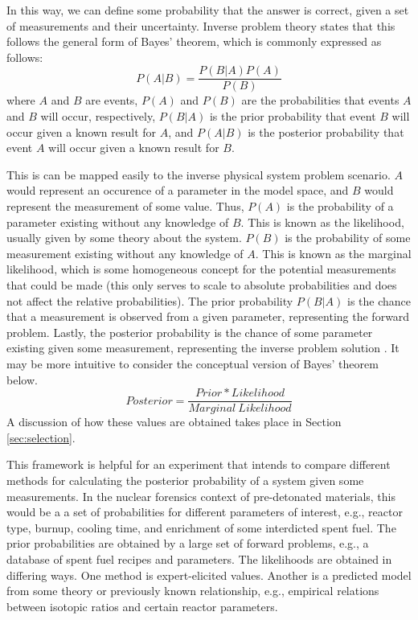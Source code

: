 In this way, we can define some probability that the answer is correct, given a
set of measurements and their uncertainty. Inverse problem theory states that
this follows the general form of Bayes' theorem, which is commonly expressed as
follows:
\begin{equation}
P(A|B) = \frac{P(B|A)P(A)}{P(B)}
\end{equation}
where $A$ and $B$ are events, $P(A)$ and $P(B)$ are the probabilities that events
$A$ and $B$ will occur, respectively, $P(B|A)$ is the prior probability that event 
$B$ will occur given a known result for $A$, and $P(A|B)$ is the posterior 
probability that event $A$ will occur given a known result for $B$.

This is can be mapped easily to the inverse physical system problem scenario.
$A$ would represent an occurence of a parameter in the model space, and $B$
would represent the measurement of some value. Thus, $P(A)$ is the probability
of a parameter existing without any knowledge of $B$. This is known as the
likelihood, usually given by some theory about the system. $P(B)$ is the
probability of some measurement existing without any knowledge of $A$. This is
known as the marginal likelihood, which is some homogeneous concept for the
potential measurements that could be made (this only serves to scale to
absolute probabilities and does not affect the relative probabilities). The
prior probability $P(B|A)$ is the chance that a measurement is observed from a
given parameter, representing the forward problem.  Lastly, the posterior
probability is the chance of some parameter existing given some measurement,
representing the inverse problem solution \cite{inverse_theory}.  It may be
more intuitive to consider the conceptual version of Bayes' theorem below.  
\begin{equation}
Posterior = \frac{Prior * Likelihood}{Marginal \ Likelihood} 
\end{equation} 
A discussion of how these values are obtained takes place in Section
\ref{sec:selection}.

This framework is helpful for an experiment that intends to compare different
methods for calculating the posterior probability of a system given some
measurements.  In the nuclear forensics context of pre-detonated materials,
this would be a a set of probabilities for different parameters of interest,
e.g., reactor type, burnup, cooling time, and enrichment of some interdicted
spent fuel. The prior probabilities are obtained by a large set of forward
problems, e.g., a database of spent fuel recipes and parameters. The
likelihoods are obtained in differing ways. One method is expert-elicited
values. Another is a predicted model from some theory or previously known
relationship, e.g., empirical relations between isotopic ratios and certain
reactor parameters. 
